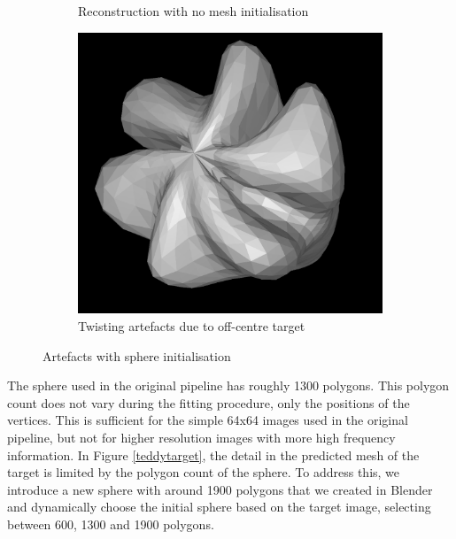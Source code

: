 \documentclass{article}
\begin{document}
\begin{figure}[h!]
\begin{subfigure}{0.25\textwidth}
      \caption{Reconstruction with no mesh initialisation}
      \label{bucketfailure_a}
  \end{subfigure}
  \hfill
  \begin{subfigure}{0.25\textwidth}
    \centering
      \includegraphics[width=\textwidth]{images/bucketartefact.png}
      \caption{Twisting artefacts due to off-centre target}
      \label{bucketfailure_b}
  \end{subfigure}
  \caption{Artefacts with sphere initialisation}
  \label{buckettarget}
\end{figure}

The sphere used in the original pipeline has roughly 1300 polygons. This polygon count does not vary during the fitting procedure, only the positions of the vertices. This is sufficient for the simple 64x64 images used in the original pipeline, but not for higher resolution images with more high frequency information. In Figure \ref{teddytarget}, the detail in the predicted mesh of the target is limited by the polygon count of the sphere. To address this, we introduce a new sphere with around 1900 polygons that we created in Blender and dynamically choose the initial sphere based on the target image, selecting between 600, 1300 and 1900 polygons.
\end{document}
